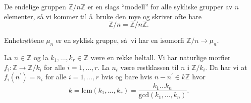 \begin{remark}
    De endelige gruppen $\mathbb Z / n\mathbb Z$ er en slags ``modell''
    for alle sykliske grupper av $n$ elementer,
    så vi kommer til å bruke den mye og skriver ofte bare
    \[
        \mathbb Z / n = \mathbb Z / n\mathbb Z.
    \]
\end{remark}

\begin{example}
    Enhetrøttene $\mu_n$ er en syklisk gruppe,
    så vi har en isomorfi $\mathbb Z / n \to \mu_n$.
\end{example}

\begin{theorem}\label{thm:chinese-remainder}
    La $n\in \mathbb Z$ og la $k_1,\dots, k_r\in \mathbb Z$ være en rekke heltall.
    Vi har naturlige morfier $f_i\colon \mathbb Z\to \mathbb Z / k_i$
    for alle $i=1,\dots,r$.
    La $n_i$ være restklassen til $n$ i $\mathbb Z / k_i$.
    Da har vi at $f_i(n^\prime) = n_i$ for alle $i=1,\dots,r$
    hvis og bare hvis $n - n^\prime\in k\mathbb Z$ hvor
    \[
        k
        = \mathrm{lcm}(k_1,\dots,k_r)
        = \frac {k_1\dots k_n}{\mathrm{gcd}(k_1,\dots,k_n)}.
    \]
\end{theorem}

